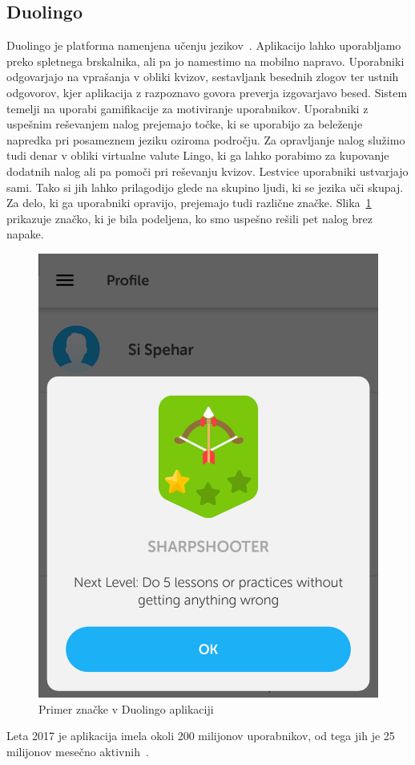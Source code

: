 \documentclass[a4paper, 12pt]{book}
\begin{document}
\subsection{Duolingo}
Duolingo je platforma namenjena učenju jezikov~\cite{Duolingo}. Aplikacijo lahko uporabljamo preko spletnega brskalnika, ali pa jo namestimo na mobilno napravo. Uporabniki odgovarjajo na vprašanja v obliki kvizov, sestavljank besednih zlogov ter ustnih odgovorov, kjer aplikacija z razpoznavo govora preverja izgovarjavo besed. Sistem temelji na uporabi gamifikacije za motiviranje uporabnikov. Uporabniki z uspešnim reševanjem nalog prejemajo točke, ki se uporabijo za beleženje napredka pri posameznem jeziku oziroma področju. Za opravljanje nalog služimo tudi denar v obliki virtualne valute Lingo, ki ga lahko porabimo za kupovanje dodatnih nalog ali pa pomoči pri reševanju kvizov. Lestvice uporabniki ustvarjajo sami. Tako si jih lahko prilagodijo glede na skupino ljudi, ki se jezika uči skupaj. \\Za delo, ki ga uporabniki opravijo, prejemajo tudi različne značke. Slika~\ref{duo_znacke} prikazuje značko, ki je bila podeljena, ko smo uspešno rešili pet nalog brez napake.
\begin{figure}[H]
\centering
\includegraphics[height=0.7\textwidth]{slike/duo_znacka}
\caption{Primer značke v Duolingo aplikaciji}\label{duo_znacke}
\end{figure}
\noindent Leta 2017 je aplikacija imela okoli 200 milijonov uporabnikov, od tega jih je 25 milijonov mesečno aktivnih~\cite{Duolingo_stats}.
\end{document}
